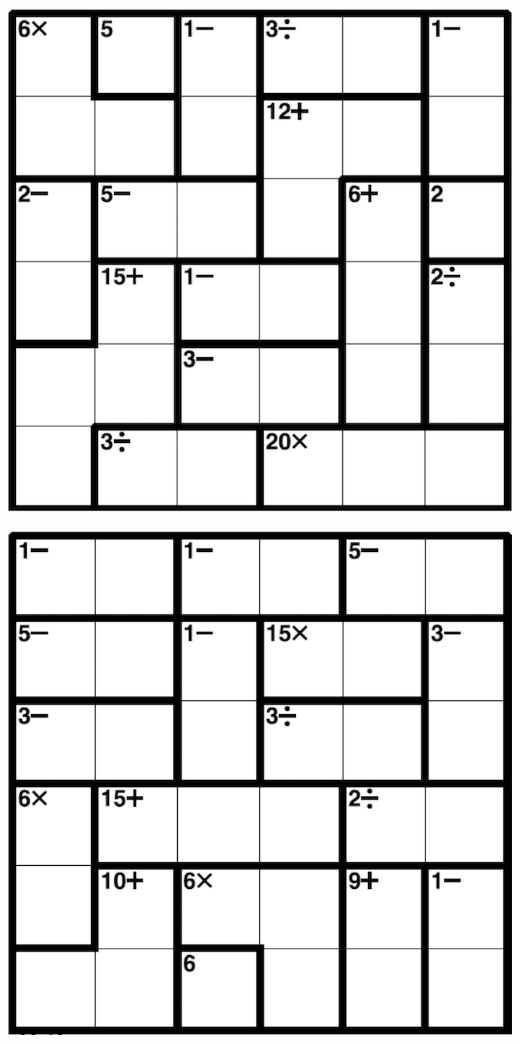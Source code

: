 
\includegraphics[scale=1]{Gambar/Lampiran/6x6_29.png}

\includegraphics[scale=1]{Gambar/Lampiran/6x6_30.png}
